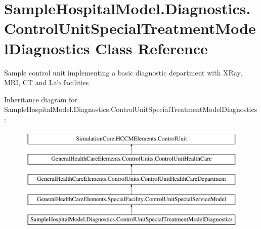 \hypertarget{class_sample_hospital_model_1_1_diagnostics_1_1_control_unit_special_treatment_model_diagnostics}{}\section{Sample\+Hospital\+Model.\+Diagnostics.\+Control\+Unit\+Special\+Treatment\+Model\+Diagnostics Class Reference}
\label{class_sample_hospital_model_1_1_diagnostics_1_1_control_unit_special_treatment_model_diagnostics}


Sample control unit implementing a basic diagnostic department with X\+Ray, M\+RI, CT and Lab facilities  


Inheritance diagram for Sample\+Hospital\+Model.\+Diagnostics.\+Control\+Unit\+Special\+Treatment\+Model\+Diagnostics\+:\begin{figure}[H]
\begin{center}
\leavevmode
\includegraphics[height=5.000000cm]{class_sample_hospital_model_1_1_diagnostics_1_1_control_unit_special_treatment_model_diagnostics}
\end{center}
\end{figure}
